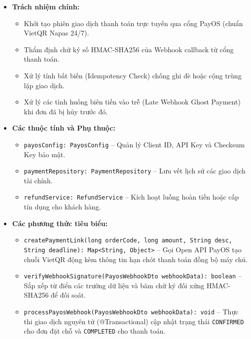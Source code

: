 \begin{itemize}
    \item \textbf{Trách nhiệm chính:}
    \begin{itemize}
        \item Khởi tạo phiên giao dịch thanh toán trực tuyến qua cổng PayOS (chuẩn VietQR Napas 24/7).
        \item Thẩm định chữ ký số HMAC-SHA256 của Webhook callback từ cổng thanh toán.
        \item Xử lý tính bất biến (Idempotency Check) chống ghi đè hoặc cộng trùng lặp giao dịch.
        \item Xử lý các tình huống biên tiền vào trễ (Late Webhook Ghost Payment) khi đơn đã bị hủy trước đó.
    \end{itemize}
    \item \textbf{Các thuộc tính và Phụ thuộc:}
    \begin{itemize}
        \item \texttt{payosConfig: PayosConfig} -- Quản lý Client ID, API Key và Checksum Key bảo mật.
        \item \texttt{paymentRepository: PaymentRepository} -- Lưu vết lịch sử các giao dịch tài chính.
        \item \texttt{refundService: RefundService} -- Kích hoạt luồng hoàn tiền hoặc cấp tín dụng cho khách hàng.
    \end{itemize}
    \item \textbf{Các phương thức tiêu biểu:}
    \begin{itemize}
        \item \texttt{createPaymentLink(long orderCode, long amount, String desc, String deadline): Map<String, Object>} -- Gọi Open API PayOS tạo chuỗi VietQR động kèm thông tin hạn chót thanh toán đồng bộ máy chủ.
        \item \texttt{verifyWebhookSignature(PayosWebhookDto webhookData): boolean} -- Sắp xếp từ điển các trường dữ liệu và băm chữ ký đối xứng HMAC-SHA256 để đối soát.
        \item \texttt{processPayosWebhook(PayosWebhookDto webhookData): void} -- Thực thi giao dịch nguyên tử (@Transactional) cập nhật trạng thái \texttt{CONFIRMED} cho đơn đặt chỗ và \texttt{COMPLETED} cho thanh toán.
    \end{itemize}
\end{itemize}

